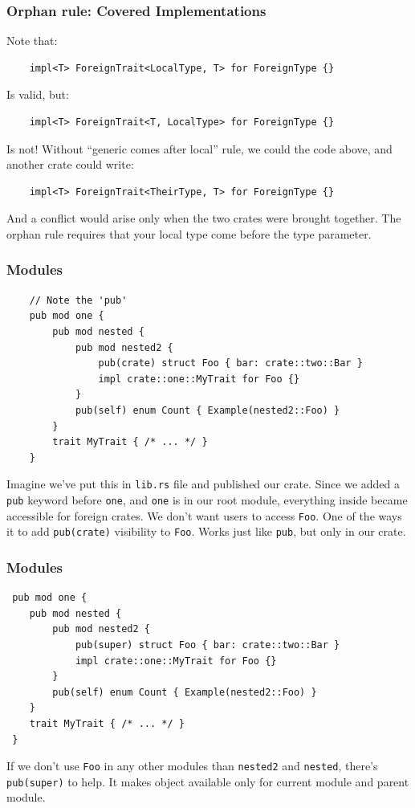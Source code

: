 \documentclass[aspectratio=1610,t]{beamer}
\begin{document}
\begin{frame}[fragile]
\frametitle{Orphan rule: Covered Implementations}
Note that:

\begin{verbatim}
    impl<T> ForeignTrait<LocalType, T> for ForeignType {}
\end{verbatim}

Is valid, but:

\begin{verbatim}
    impl<T> ForeignTrait<T, LocalType> for ForeignType {}
\end{verbatim}

Is not! Without ``generic comes after local'' rule, we could the code above, and another crate could write:

\begin{verbatim}
    impl<T> ForeignTrait<TheirType, T> for ForeignType {}
\end{verbatim}

And a conflict would arise only when the two crates were brought together. The orphan rule requires that your local type come before the type parameter.
\end{frame}


\begin{frame}[fragile,c]
\frametitle{Modules}
\begin{verbatim}
    // Note the 'pub'
    pub mod one {
        pub mod nested {
            pub mod nested2 {
                pub(crate) struct Foo { bar: crate::two::Bar }
                impl crate::one::MyTrait for Foo {}
            }
            pub(self) enum Count { Example(nested2::Foo) }
        }
        trait MyTrait { /* ... */ }
    }
\end{verbatim}

Imagine we've put this in \texttt{lib.rs} file and published our crate. Since we added a \texttt{pub} keyword before \texttt{one}, and \texttt{one} is in our root module, everything inside became accessible for foreign crates. We don't want users to access \texttt{Foo}. One of the ways it to add \texttt{pub(crate)} visibility to \texttt{Foo}. Works just like \texttt{pub}, but only in our crate.
\end{frame}


\begin{frame}[fragile]
\frametitle{Modules}
\begin{verbatim}
 pub mod one {
    pub mod nested {
        pub mod nested2 {
            pub(super) struct Foo { bar: crate::two::Bar }
            impl crate::one::MyTrait for Foo {}
        }
        pub(self) enum Count { Example(nested2::Foo) }
    }
    trait MyTrait { /* ... */ }
 }
\end{verbatim}

If we don't use \texttt{Foo} in any other modules than \texttt{nested2} and \texttt{nested}, there's \texttt{pub(super)} to help. It makes object available only for current module and parent module.
\end{frame}
\end{document}
